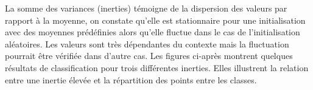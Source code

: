 		La somme des variances (inerties) témoigne de la dispersion des valeurs par rapport à la moyenne, on constate qu'elle est stationnaire pour une initialisation avec des moyennes prédéfinies alors qu'elle fluctue dans le cas de l'initialisation aléatoires. Les valeurs sont très dépendantes du contexte mais la fluctuation pourrait être vérifiée dans d'autre cas. Les figures ci-après montrent quelques résultats de classification pour trois différentes inerties. Elles illustrent la relation entre une inertie élevée et la répartition des points entre les classes.	%
				

